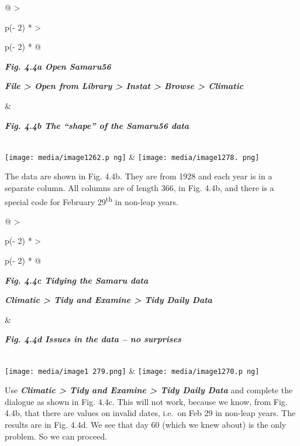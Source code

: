 \documentclass[
  letterpaper,
  DIV=11,
  numbers=noendperiod]{scrreprt}
\begin{document}
\begin{longtable}[]{@{}
  >{\raggedright\arraybackslash}p{(\columnwidth - 2\tabcolsep) * }
  >{\raggedright\arraybackslash}p{(\columnwidth - 2\tabcolsep) * }@{}}
\toprule\noalign{}
\begin{minipage}[b]{\linewidth}\raggedright
\textbf{\emph{Fig. 4.4a Open Samaru56}}

\textbf{\emph{File \textgreater{} Open from Library \textgreater{}
Instat \textgreater{} Browse \textgreater{} Climatic}}
\end{minipage} & \begin{minipage}[b]{\linewidth}\raggedright
\textbf{\emph{Fig. 4.4b The ``shape'' of the Samaru56 data}}
\end{minipage} \\
\midrule\noalign{}
\endhead
\bottomrule\noalign{}
\endlastfoot
\texttt{[image: media/image1262.p ng]}
&
\texttt{[image: media/image1278. png]} \\
\end{longtable}

The data are shown in Fig. 4.4b. They are from 1928 and each year is in
a separate column. All columns are of length 366, in Fig. 4.4b, and
there is a special code for February 29\textsuperscript{th} in non-leap
years.

\begin{longtable}[]{@{}
  >{\raggedright\arraybackslash}p{(\columnwidth - 2\tabcolsep) * }
  >{\raggedright\arraybackslash}p{(\columnwidth - 2\tabcolsep) * }@{}}
\toprule\noalign{}
\begin{minipage}[b]{\linewidth}\raggedright
\textbf{\emph{Fig. 4.4c Tidying the Samaru data}}

\textbf{\emph{Climatic \textgreater{} Tidy and Examine \textgreater{}
Tidy Daily Data}}
\end{minipage} & \begin{minipage}[b]{\linewidth}\raggedright
\textbf{\emph{Fig. 4.4d Issues in the data -- no surprises}}
\end{minipage} \\
\midrule\noalign{}
\endhead
\bottomrule\noalign{}
\endlastfoot
\texttt{[image: media/image1 279.png]}
&
\texttt{[image: media/image1270.p ng]} \\
\end{longtable}

Use \textbf{\emph{Climatic \textgreater{} Tidy and Examine
\textgreater{} Tidy Daily Data}} and complete the dialogue as shown in
Fig. 4.4c. This will not work, because we know, from Fig. 4.4b, that
there are values on invalid dates, i.e.~on Feb 29 in non-leap years. The
results are in Fig. 4.4d. We see that day 60 (which we knew about) is
the only problem. So we can proceed.
\end{document}
